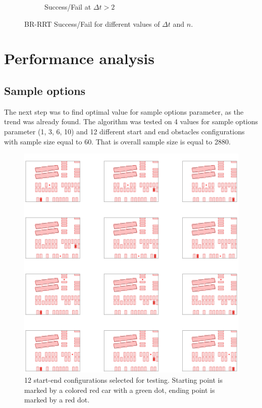 \documentclass[a4paper,12pt]{article}
\DeclareRobustCommand{\[}{\begin{equation}}
\DeclareRobustCommand{\]}{\end{equation}}
\numberwithin{equation}{section}
\numberwithin{algorithm}{section}
\begin{document}
\begin{figure}[H]
\begin{subfigure}[b]{0.8\textwidth}
        \caption{Success/Fail at $\Delta{t} > 2$}
    \end{subfigure}
    \caption{BR-RRT Success/Fail for different values of $\Delta{t}$ and $n$.}
    \label{fig:brrrt_finish_pie_high}
\end{figure}

\section{Performance analysis}
\subsection{Sample options}
The next step was to find optimal value for sample options parameter, as the trend was already found. The algorithm was tested on 4 values for sample options parameter (1, 3, 6, 10) and 12 different start and end obstacles configurations with sample size equal to 60. That is overall sample size is equal to 2880.
\begin{figure}[H]
\begin{center}
\includegraphics[scale=0.4]{images/12positions.png}
\captionsetup{width=0.6\textwidth}
\caption{12 start-end configurations selected for testing. Starting point is marked by a colored red car with a green dot, ending point is marked by a red dot.}
\end{center}
\end{figure}
\end{document}
